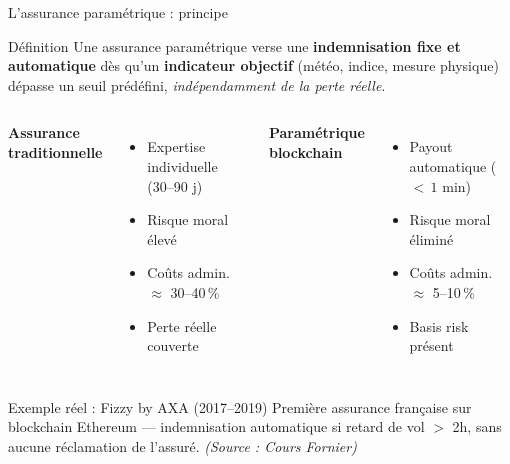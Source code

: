 \documentclass[aspectratio=169, 10pt, t]{beamer}
\begin{document}
\begin{frame}{L'assurance paramétrique : principe}
  \begin{block}{Définition}
    Une assurance paramétrique verse une \textbf{indemnisation fixe et
    automatique} dès qu'un \textbf{indicateur objectif} (météo, indice,
    mesure physique) dépasse un seuil prédéfini, \emph{indépendamment de la
    perte réelle}.
  \end{block}

  \vspace{0.3em}
  \begin{columns}[c]
      \textbf{\color{AlertRed} Assurance traditionnelle}
      \begin{itemize}
        \setlength{\itemsep}{3pt}
        \item[\textcolor{AlertRed}{\faTimesCircle}] Expertise individuelle (30--90 j)
        \item[\textcolor{AlertRed}{\faTimesCircle}] Risque moral élevé
        \item[\textcolor{AlertRed}{\faTimesCircle}] Coûts admin. $\approx$ 30--40\,\%
        \item[\textcolor{SuccessGreen}{\faCheckCircle}] Perte réelle couverte
      \end{itemize}
      \textbf{\color{SuccessGreen} Paramétrique blockchain}
      \begin{itemize}
        \setlength{\itemsep}{3pt}
        \item[\textcolor{SuccessGreen}{\faCheckCircle}] Payout automatique ($<\,1$ min)
        \item[\textcolor{SuccessGreen}{\faCheckCircle}] Risque moral éliminé
        \item[\textcolor{SuccessGreen}{\faCheckCircle}] Coûts admin. $\approx$ 5--10\,\%
        \item[\textcolor{WarnOrange}{\faExclamationTriangle}] Basis risk présent
      \end{itemize}
  \end{columns}

  \vspace{0.4em}
  \begin{alertblock}{\small Exemple réel : Fizzy by AXA (2017--2019)}
    \small
    Première assurance française sur blockchain Ethereum ---
    indemnisation automatique si retard de vol $>$ 2h,
    sans aucune réclamation de l'assuré.
    \hfill \textit{(Source : Cours Fornier)}
  \end{alertblock}
\end{frame}
\end{document}
